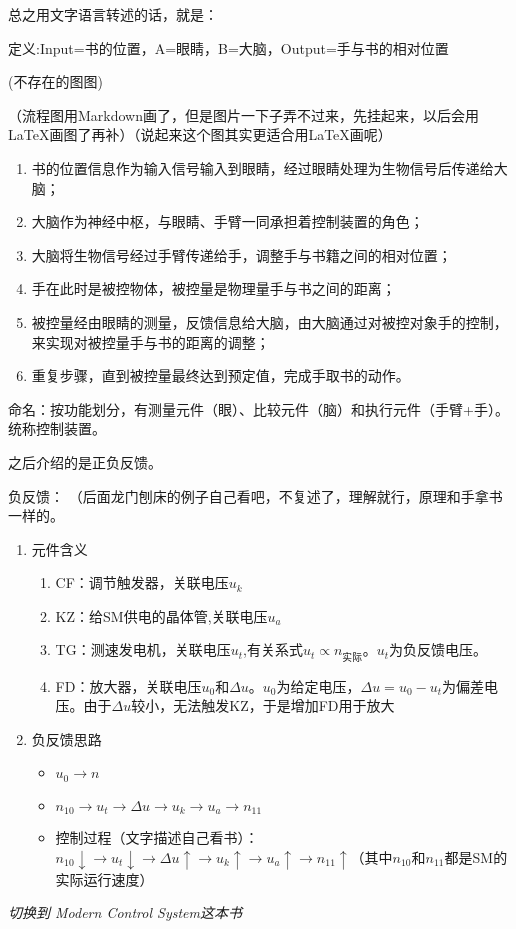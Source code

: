 \documentclass{NHNotebook}
\begin{document}
总之用文字语言转述的话，就是：

定义:Input=书的位置，A=眼睛，B=大脑，Output=手与书的相对位置

    (不存在的图图)%
    
    （流程图用Markdown画了，但是图片一下子弄不过来，先挂起来，以后会用LaTeX画图了再补）（说起来这个图其实更适合用\LaTeX 画呢）

\begin{enumerate}    
    \item 书的位置信息作为输入信号输入到眼睛，经过眼睛处理为生物信号后传递给大脑；
    \item 大脑作为神经中枢，与眼睛、手臂一同承担着控制装置的角色；
    \item 大脑将生物信号经过手臂传递给手，调整手与书籍之间的相对位置；
    \item 手在此时是被控物体，被控量是物理量手与书之间的距离；
    \item 被控量经由眼睛的测量，反馈信息给大脑，由大脑通过对被控对象手的控制，来实现对被控量手与书的距离的调整；
    \item 重复步骤，直到被控量最终达到预定值，完成手取书的动作。
\end{enumerate}

命名：按功能划分，有测量元件（眼）、比较元件（脑）和执行元件（手臂+手）。统称控制装置。

之后介绍的是正负反馈。

负反馈：
（后面龙门刨床的例子自己看吧，不复述了，理解就行，原理和手拿书一样的。
\begin{enumerate}
    \item 元件含义
    \begin{enumerate}
        \item CF：调节触发器，关联电压$u_k$
        \item KZ：给SM供电的晶体管,关联电压$u_a$
        \item TG：测速发电机，关联电压$u_t$,有关系式$u_t\propto n_{实际}$。$u_t$为负反馈电压。
        \item FD：放大器，关联电压$u_0$和$\Delta u$。$u_0$为给定电压，$\Delta u = u_0 - u_t$为偏差电压。由于$\Delta u$较小，无法触发KZ，于是增加FD用于放大
    \end{enumerate}
    \item 负反馈思路
    \begin{itemize}
        \item $u_0 \to n$
        \item $n_{10} \to u_t \to \Delta u \to u_k \to u_a \to n_{11}$
        \item 控制过程（文字描述自己看书）：$n_{10}\downarrow \to u_t\downarrow \to \Delta u\uparrow \to u_k\uparrow \to u_a\uparrow \to n_{11}\uparrow$（其中$n_{10}$和$n_{11}$都是SM的实际运行速度）
    \end{itemize}
\end{enumerate}




\emph{切换到 Modern Control System这本书}





\backmatter
\end{document}
